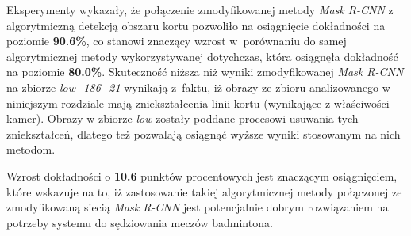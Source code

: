 Eksperymenty wykazały, że połączenie zmodyfikowanej metody \textit{Mask R-CNN} z algorytmiczną detekcją obszaru kortu pozwoliło na osiągnięcie dokładności na poziomie \textbf{90.6\%}, co stanowi znaczący wzrost w~porównaniu do samej algorytmicznej metody wykorzystywanej dotychczas, która osiągnęła dokładność na poziomie \textbf{80.0\%}.
Skuteczność niższa niż wyniki zmodyfikowanej \textit{Mask R-CNN} na zbiorze \textit{low\_186\_21} wynikają z~faktu, iż obrazy ze zbioru analizowanego w niniejszym rozdziale mają zniekształcenia linii kortu (wynikające z właściwości kamer). Obrazy w zbiorze \textit{low} zostały poddane procesowi usuwania tych zniekształceń, dlatego też pozwalają osiągnąć wyższe wyniki stosowanym na nich metodom.

Wzrost dokładności o \textbf{10.6} punktów procentowych jest znaczącym osiągnięciem, które wskazuje na to, iż zastosowanie takiej algorytmicznej metody połączonej ze zmodyfikowaną siecią \textit{Mask R-CNN} jest potencjalnie dobrym rozwiązaniem na potrzeby systemu do sędziowania meczów badmintona.
